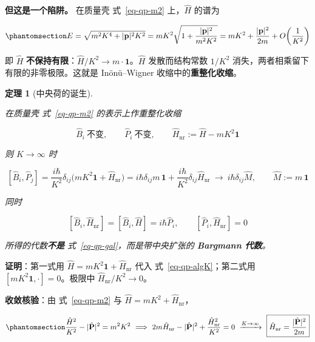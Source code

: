 \documentclass[
  chinese,
  a4paper,
  UTF8,
  12pt,
  oneside,
  openany]{ctexbook}
\theoremstyle{plain}
\newtheorem{theorem}{定理}[chapter]
\theoremstyle{plain}
\theoremstyle{plain}
\theoremstyle{definition}
\theoremstyle{plain}
\theoremstyle{plain}
\theoremstyle{remark}
\begin{document}
\textbf{但这是一个陷阱。} 在质量壳 式~\ref{eq-qp-m2} 上，\(\hat H\)
的谱为

\begin{equation}\protect\phantomsection\label{eq-qp-expE}{
E=\sqrt{m^{2}K^{4}+\lvert\mathbf{p}\rvert^{2}K^{2}}
=mK^{2}\sqrt{1+\frac{\lvert\mathbf{p}\rvert^{2}}{m^{2}K^{2}}}
=mK^{2}+\frac{\lvert\mathbf{p}\rvert^{2}}{2m}+O\!\left(\frac{1}{K^{2}}\right)
}\end{equation}

即 \(\hat H\)
\textbf{不保持有限}：\(\hat H/K^{2}\to m\cdot\mathbf 1\)。\(\hat H\)
发散而结构常数 \(1/K^{2}\) 消失，两者相乘留下有限的非零极限。这就是
Inönü--Wigner 收缩中的\textbf{重整化收缩}。

\begin{theorem}[中央荷的诞生]\protect\hypertarget{thm-qp-central}{}\label{thm-qp-central}

在质量壳 式~\ref{eq-qp-m2} 的表示上作重整化收缩

\[
\hat B_i\ \text{不变},\qquad \hat P_i\ \text{不变},\qquad
\hat H_{\text{nr}}:=\hat H-mK^{2}\mathbf 1
\]

则 \(K\to\infty\) 时

\[
[\hat B_i,\hat P_j]=\frac{i\hbar}{K^{2}}\delta_{ij}\bigl(mK^{2}\mathbf 1+\hat H_{\text{nr}}\bigr)
=i\hbar\delta_{ij}m\,\mathbf 1+\frac{i\hbar}{K^{2}}\delta_{ij}\hat H_{\text{nr}}
\ \longrightarrow\ \boxed{i\hbar\delta_{ij}\hat M},\qquad \hat M:=m\,\mathbf 1
\]

同时

\[
[\hat B_i,\hat H_{\text{nr}}]=[\hat B_i,\hat H]=i\hbar\hat P_i,\qquad
[\hat P_i,\hat H_{\text{nr}}]=0
\]

所得的代数\textbf{不是} 式~\ref{eq-qp-gal}，而是带中央扩张的
\textbf{Bargmann 代数}。

\end{theorem}

\textbf{证明}：第一式用 \(\hat H=mK^{2}\mathbf 1+\hat H_{\text{nr}}\)
代入 式~\ref{eq-qp-algK}；第二式用 \([mK^{2}\mathbf 1,\cdot]=0\)。极限中
\(\hat H_{\text{nr}}/K^{2}\to0\)。

\textbf{收敛核验}：由 式~\ref{eq-qp-m2} 与
\(\hat H=mK^{2}+\hat H_{\text{nr}}\)，

\begin{equation}\protect\phantomsection\label{eq-qp-casimir-contract}{
\frac{\hat H^{2}}{K^{2}}-\lvert\hat{\mathbf P}\rvert^{2}=m^{2}K^{2}
\ \Longrightarrow\ 2m\hat H_{\text{nr}}-\lvert\hat{\mathbf P}\rvert^{2}+\frac{\hat H_{\text{nr}}^{2}}{K^{2}}=0
\ \xrightarrow{K\to\infty}\ \boxed{\hat H_{\text{nr}}=\frac{\lvert\hat{\mathbf P}\rvert^{2}}{2m}}
}\end{equation}
\end{document}

